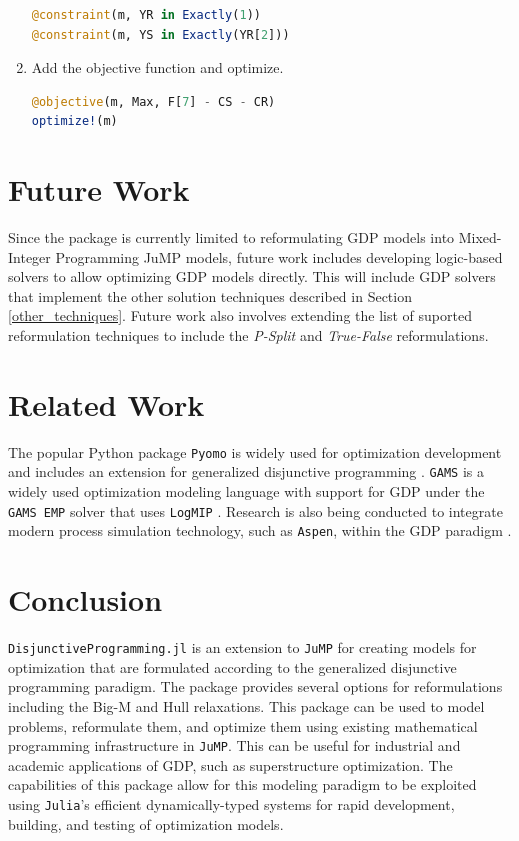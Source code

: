 \documentclass{juliacon}
\begin{document}
\begin{enumerate}
\begin{lstlisting}[language = Julia]
@constraint(m, YR in Exactly(1))
@constraint(m, YS in Exactly(YR[2]))
\end{lstlisting}
    \item Add the objective function and optimize. 
\begin{lstlisting}[language = Julia]
@objective(m, Max, F[7] - CS - CR)
optimize!(m)
\end{lstlisting}
\end{enumerate}

\section{Future Work}
Since the package is currently limited to reformulating GDP models into Mixed-Integer Programming JuMP models, future work includes developing logic-based solvers to allow optimizing GDP models directly. This will include GDP solvers that implement the other solution techniques described in Section \ref{other_techniques}. Future work also involves extending the list of suported reformulation techniques to include the \textit{P-Split} \cite{kronqvist2022p} and \textit{True-False} \cite{agarwal2015novel} reformulations.

\section{Related Work}
The popular Python package \verb|Pyomo| \cite{bynum2021pyomo, hart2011pyomo} is widely used for optimization development and includes an extension for generalized disjunctive programming \cite{chen2022pyomo}. \verb|GAMS| \cite{Bussieck2004} is a widely used optimization modeling language with support for GDP under the \verb|GAMS EMP| solver that uses \verb|LogMIP| \cite{vecchietti1999logmip}. Research is also being conducted to integrate modern process simulation technology, such as \verb|Aspen|, within the GDP paradigm \cite{NAVARROAMOROS201413}.

\section{Conclusion}
\verb|DisjunctiveProgramming.jl| is an extension to \verb|JuMP| for creating models for optimization that are formulated according to the generalized disjunctive programming paradigm. The package provides several options for reformulations including the Big-M and Hull relaxations. This package can be used to model problems, reformulate them, and optimize them using existing mathematical programming infrastructure in \verb|JuMP|. This can be useful for industrial and academic applications of GDP, such as superstructure optimization. The capabilities of this package allow for this modeling paradigm to be exploited using \verb|Julia|'s efficient dynamically-typed systems for rapid development, building, and testing of optimization models.


\end{document}
